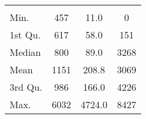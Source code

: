 \begin{tabular}{lS[table-format=5.1]S[table-format=5.1]S[table-format=5.1]}
&  &  &  \\
 Min.    & 457 & 11.0 & 0 \\
 1st Qu. & 617 & 58.0 & 151 \\
 Median  & 800 & 89.0 & 3268 \\
 Mean    & 1151 & 208.8 & 3069 \\
 3rd Qu. & 986 & 166.0 & 4226 \\
 Max.    & 6032 & 4724.0 & 8427 \\
\end{tabular}
